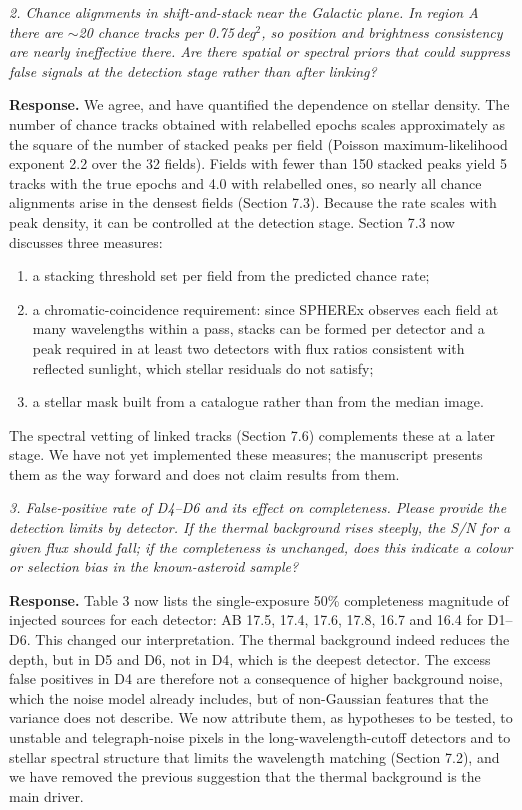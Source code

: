 \documentclass[11pt]{article}
\newenvironment{referee}{\par\color{black!60}\itshape}{\par}
\newcommand{\resp}{\par\noindent\textbf{Response.} }
\begin{document}
\begin{referee}
2. Chance alignments in shift-and-stack near the Galactic plane. In region A there are $\sim$20 chance tracks per 0.75\,deg$^2$, so position and brightness consistency are nearly ineffective there. Are there spatial or spectral priors that could suppress false signals at the detection stage rather than after linking?
\end{referee}
\resp We agree, and have quantified the dependence on stellar density. The number of chance tracks obtained with relabelled epochs scales approximately as the square of the number of stacked peaks per field (Poisson maximum-likelihood exponent 2.2 over the 32 fields). Fields with fewer than 150 stacked peaks yield 5 tracks with the true epochs and 4.0 with relabelled ones, so nearly all chance alignments arise in the densest fields (Section 7.3). Because the rate scales with peak density, it can be controlled at the detection stage. Section 7.3 now discusses three measures:
\begin{enumerate}
\item a stacking threshold set per field from the predicted chance rate;
\item a chromatic-coincidence requirement: since SPHEREx observes each field at many wavelengths within a pass, stacks can be formed per detector and a peak required in at least two detectors with flux ratios consistent with reflected sunlight, which stellar residuals do not satisfy;
\item a stellar mask built from a catalogue rather than from the median image.
\end{enumerate}
The spectral vetting of linked tracks (Section 7.6) complements these at a later stage. We have not yet implemented these measures; the manuscript presents them as the way forward and does not claim results from them.

\begin{referee}
3. False-positive rate of D4--D6 and its effect on completeness. Please provide the detection limits by detector. If the thermal background rises steeply, the S/N for a given flux should fall; if the completeness is unchanged, does this indicate a colour or selection bias in the known-asteroid sample?
\end{referee}
\resp Table 3 now lists the single-exposure 50\% completeness magnitude of injected sources for each detector: AB 17.5, 17.4, 17.6, 17.8, 16.7 and 16.4 for D1--D6. This changed our interpretation. The thermal background indeed reduces the depth, but in D5 and D6, not in D4, which is the deepest detector. The excess false positives in D4 are therefore not a consequence of higher background noise, which the noise model already includes, but of non-Gaussian features that the variance does not describe. We now attribute them, as hypotheses to be tested, to unstable and telegraph-noise pixels in the long-wavelength-cutoff detectors and to stellar spectral structure that limits the wavelength matching (Section 7.2), and we have removed the previous suggestion that the thermal background is the main driver.
\end{document}
